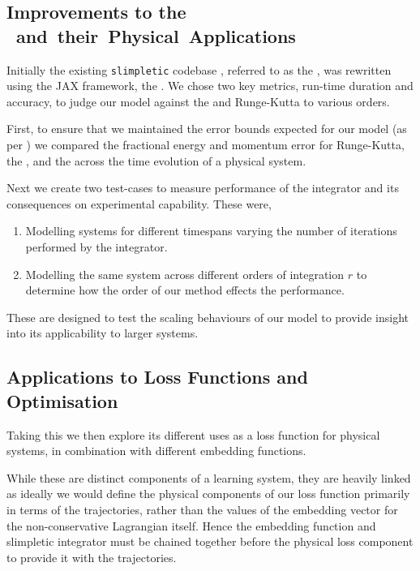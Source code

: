 \subsection{Improvements to the \SI{} and their Physical Applications}

Initially the existing \texttt{slimpletic} codebase \cite{originalCode}, referred to as the \orgimpl{}, was rewritten using the JAX framework, the \updimpl{}. We chose two key metrics, run-time duration and accuracy, to judge our model against the \orgimpl{} and Runge-Kutta to various orders.

First, to ensure that we maintained the error bounds expected for our model (as per ) we compared the fractional energy and momentum error for Runge-Kutta, the \orgimpl{}, and the \updimpl{} across the time evolution of a physical system.

Next we create two test-cases to measure performance of the integrator and its consequences on experimental capability. These were,

\begin{enumerate}
	\item Modelling systems for different timespans varying the number of iterations performed by the integrator.
	\item Modelling the same system across different orders of integration $r$ to determine how the order of our method effects the performance.
\end{enumerate}

These are designed to test the scaling behaviours of our model to provide insight into its applicability to larger systems.

\subsection{Applications to Loss Functions and Optimisation}

Taking this \updimpl{} we then explore its different uses as a loss function for physical systems, in combination with different embedding functions.

While these are distinct components of a learning system, they are heavily linked as ideally we would define the physical components of our loss function primarily in terms of the trajectories, rather than the values of the embedding vector for the non-conservative Lagrangian itself.
Hence the embedding function and slimpletic integrator must be chained together before the physical loss component to provide it with the trajectories.

